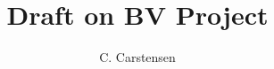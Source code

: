 \setcounter{stepc}{0}
\newcommand{\step}[1]{\refstepcounter{stepc}{\smallskip

\noindent \textit{Step \thestepc \ (#1):}}}



\newcommand{\R}{\mathbb{R}}
\newcommand{\dx}{\,\mathrm dx}
\newcommand{\ds}{\,\mathrm ds}

\newcommand{\ddiv}{\operatorname{div}}
\def\mint{-\kern-1.00em\int}
\newcommand{\tri}{\mathcal T}
\newcommand{\E}{\mathcal E}


\newcommand{\ucr}{u_{\operatorname{CR}}}
\newcommand{\ucrvarepsilon}{u_{\operatorname{CR},\varepsilon}}
\newcommand{\vcr}{v_{\operatorname{CR}}}
\newcommand{\wcr}{w_{\operatorname{CR}}}
\newcommand{\nc}{{\textup{\tiny NC}}}
\newcommand{\ucreps}{u_{\varepsilon,\operatorname{CR}}}

\newcommand{\Cont}{C}
\newcommand{\RT}{\operatorname{RT}_0}
\newcommand{\rt}{{\operatorname{RT}}}
\newcommand{\prt}{p_{\operatorname{RT}}}
\newcommand{\qrt}{q_{\operatorname{RT}}}
\newcommand{\rrt}{r_{\operatorname{RT}}}
\newcommand{\CR}{{\operatorname{CR}}^1_0}
\newcommand{\Cr}{{\operatorname{CR}}}

\newcommand{\midp}{{\operatorname{mid}}}
\newcommand{\F}{\mathcal{F}}

\newcommand{\N}{\mathcal{N}}
\newcommand{\grad}{\nabla}
\newcommand{\gradnc}{\nabla_\nc}
\newcommand{\divnc}{\operatorname{div}_\nc}
\newcommand{\T}{\mathcal{T}}

\newcommand{\BV}{\operatorname{BV}}
\newcommand{\osc}{\operatorname{osc}}
\newcommand\normg[2]{\left\| #1 \right\|_{L^2( #2 )}}
\newcommand{\EL}{{\operatorname{EL}}}

\newcommand{\conf}{\textup{\tiny C}}

\DeclareMathOperator{\sign}{sign}

\title{Draft on BV Project}
\author{C. Carstensen}
\maketitle
